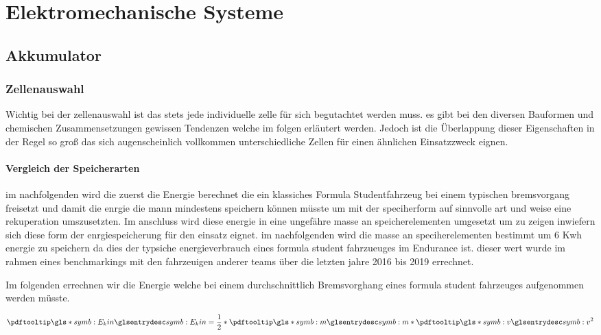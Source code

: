 
\chapter{Elektromechanische Systeme}

\section{Akkumulator}

\subsection{Zellenauswahl}

Wichtig bei der zellenauswahl ist das stets jede individuelle zelle für sich begutachtet werden muss. es gibt bei den diversen Bauformen und chemischen Zusammensetzungen gewissen Tendenzen welche im folgen erläutert werden. Jedoch ist die Überlappung dieser Eigenschaften in der Regel so groß das sich augenscheinlich vollkommen unterschiedliche Zellen für einen ähnlichen Einsatzzweck eignen.

\subsubsection{Vergleich der Speicherarten}

im nachfolgenden wird die zuerst die Energie berechnet die ein klassiches Formula Studentfahrzeug bei einem typischen bremsvorgang freisetzt und damit die enrgie die mann mindestens speichern können müsste um mit der speciherform auf sinnvolle art und weise eine rekuperation umszusetzten. Im anschluss wird diese energie in eine ungefähre masse an speicherelementen umgesetzt um zu zeigen inwiefern sich diese form der enrgiespeicherung für den einsatz eignet. im nachfolgenden wird die masse an speciherelementen bestimmt um 6 Kwh energie zu speichern da dies der typsiche energieverbrauch eines formula student fahrzueuges im Endurance ist. dieser wert wurde im rahmen eines benchmarkings mit den fahrzeuigen anderer teams über die letzten jahre 2016 bis 2019 errechnet.

Im folgenden errechnen wir die Energie welche bei einem durchschnittlich Bremsvorghang eines formula student fahrzeuges aufgenommen werden müsste. 

\begin{equation}
\glsc{symb:E_kin} = \dfrac{1}{2} * \glsc{symb:m} * \glsc{symb:v}^2
\end{equation}

